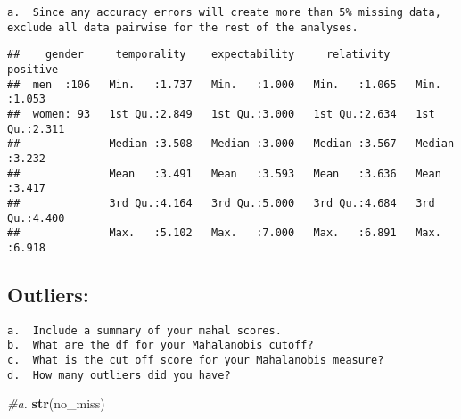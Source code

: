 \documentclass[
]{article}
\newenvironment{Shaded}{\begin{snugshade}}{\end{snugshade}}
\newcommand{\CommentTok}[1]{\textcolor[rgb]{0.56,0.35,0.01}{\textit{#1}}}
\newcommand{\KeywordTok}[1]{\textcolor[rgb]{0.13,0.29,0.53}{\textbf{#1}}}
\newcommand{\NormalTok}[1]{#1}
\newcommand{\OperatorTok}[1]{\textcolor[rgb]{0.81,0.36,0.00}{\textbf{#1}}}
\newcommand{\OtherTok}[1]{\textcolor[rgb]{0.56,0.35,0.01}{#1}}
\newcommand{\StringTok}[1]{\textcolor[rgb]{0.31,0.60,0.02}{#1}}
\begin{document}
\begin{verbatim}
a.  Since any accuracy errors will create more than 5% missing data, exclude all data pairwise for the rest of the analyses. 
\end{verbatim}

\begin{Shaded}
\end{Shaded}

\begin{verbatim}
##    gender     temporality    expectability     relativity       positive    
##  men  :106   Min.   :1.737   Min.   :1.000   Min.   :1.065   Min.   :1.053  
##  women: 93   1st Qu.:2.849   1st Qu.:3.000   1st Qu.:2.634   1st Qu.:2.311  
##              Median :3.508   Median :3.000   Median :3.567   Median :3.232  
##              Mean   :3.491   Mean   :3.593   Mean   :3.636   Mean   :3.417  
##              3rd Qu.:4.164   3rd Qu.:5.000   3rd Qu.:4.684   3rd Qu.:4.400  
##              Max.   :5.102   Max.   :7.000   Max.   :6.891   Max.   :6.918
\end{verbatim}

\hypertarget{outliers}{%
\subsection{Outliers:}\label{outliers}}

\begin{verbatim}
a.  Include a summary of your mahal scores.
b.  What are the df for your Mahalanobis cutoff?
c.  What is the cut off score for your Mahalanobis measure?
d.  How many outliers did you have? 
\end{verbatim}

\begin{Shaded}
\begin{Highlighting}[]
\CommentTok{#a.}
\KeywordTok{str}\NormalTok{(no_miss)}
\end{Highlighting}
\end{Shaded}
\end{document}

